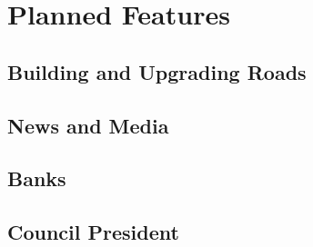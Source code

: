 \documentclass[a6paper]{report}
\begin{document}
\chapter{Planned Features}

\section{Building and Upgrading Roads}

\section{News and Media}

\section{Banks}

\section{Council President}
\end{document}
